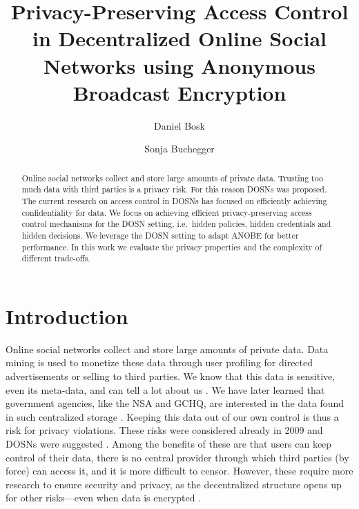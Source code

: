 \title{%
  Privacy-Preserving Access Control in
  Decentralized Online Social Networks using
  Anonymous Broadcast Encryption
}
\author{%
  Daniel Bosk \and
  Sonja Buchegger
}

\maketitle
\begin{abstract}
  Online social networks collect and store large amounts of private data.
  Trusting too much data with third parties is a privacy risk.
  For this reason \acp{DOSN} was proposed.
  The current research on access control in \acp{DOSN} has focused on 
  efficiently achieving confidentiality for data.
  We focus on achieving efficient privacy-preserving access control mechanisms 
  for the \ac{DOSN} setting, i.e.~hidden policies, hidden credentials and 
  hidden decisions.
  We leverage the \ac{DOSN} setting to adapt \ac{ANOBE} for better performance.
  In this work we evaluate the privacy properties and the complexity of 
  different trade-offs.

\end{abstract}

\acresetall
\section{Introduction}

Online social networks collect and store large amounts of private data.
Data mining is used to monetize these data through user profiling for directed 
advertisements or selling to third parties.
We know that this data is sensitive, even its meta-data, and can tell a lot 
about us \cite[e.g.][]{pregnancy}.
We have later learned that government agencies, like the \ac{NSA} and 
\ac{GCHQ}, are interested in the data found in such centralized storage 
\cite{prism}.
Keeping this data out of our own control is thus a risk for privacy violations.
These risks were considered already in 2009 and \acp{DOSN} were suggested 
\cite[e.g.][]{peerson}.
Among the benefits of these are that users can keep control of their data, 
there is no central provider through which third parties (by force) can access 
it, and it is more difficult to censor.
However, these require more research to ensure security and privacy, as the 
decentralized structure opens up for other risks---even when data is encrypted 
\cite{metadata}.

